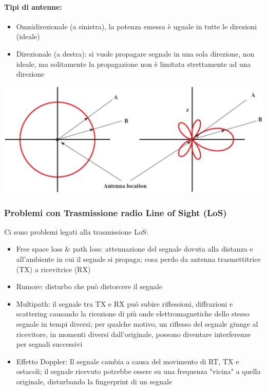 \paragraph{Tipi di antenne:}
\begin{itemize}
	\item Omnidirezionale (a sinistra), la potenza emessa è uguale in tutte le direzioni (ideale)
	\item Direzionale (a destra): si vuole propagare segnale in una sola direzione, non ideale, ma solitamente la propagazione non è limitata strettamente ad una direzione
\end{itemize}
\begin{center}
	\includegraphics[width=0.9\linewidth]{img/wireless/antenna}
\end{center}

\newpage

\subsubsection{Problemi con Trasmissione radio Line of Sight (LoS)}

Ci sono problemi legati alla trasmissione LoS:
\begin{itemize}
	\item Free space loss \& path loss: attenuazione del segnale dovuta alla distanza e all'ambiente in cui il segnale si propaga; cosa perdo da antenna trasmettitrice (TX) a ricevitrice (RX)
	\item Rumore: disturbo che può distorcere il segnale
	\item Multipath: il segnale tra TX e RX può subire riflessioni, diffrazioni e scattering causando la ricezione di più onde elettromagnetiche dello stesso segnale in tempi diversi; per qualche motivo, un riflesso del segnale giunge al ricevitore, in momenti diversi dall'originale, possono diventare interferenze per segnali successivi
	\item Effetto Doppler: Il segnale cambia a causa del movimento di RT, TX e ostacoli; il segnale ricevuto potrebbe essere su una frequenza "vicina" a quella originale, disturbando la fingerprint di un segnale
\end{itemize}

